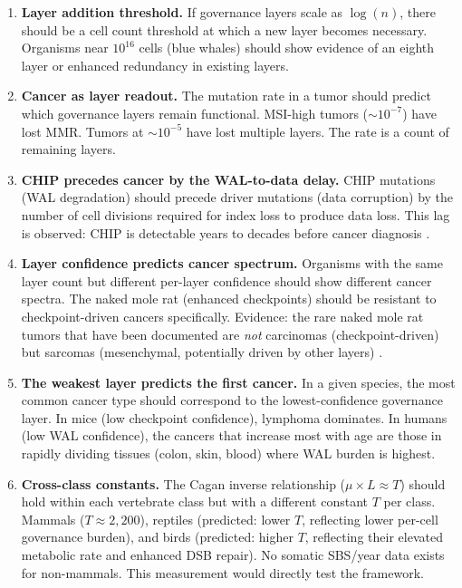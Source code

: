 \documentclass[11pt]{article}
\theoremstyle{definition}
\begin{document}
\begin{enumerate}
\item \textbf{Layer addition threshold.} If governance layers scale as
   $\log(n)$, there should be a cell count threshold at which a new
   layer becomes necessary. Organisms near $10^{16}$ cells (blue whales)
   should show evidence of an eighth layer or enhanced redundancy in
   existing layers.

\item \textbf{Cancer as layer readout.} The mutation rate in a tumor
   should predict which governance layers remain functional. MSI-high
   tumors ($\sim 10^{-7}$) have lost MMR. Tumors at $\sim 10^{-5}$
   have lost multiple layers. The rate is a count of remaining layers.

\item \textbf{CHIP precedes cancer by the WAL-to-data delay.} CHIP
   mutations (WAL degradation) should precede driver mutations (data
   corruption) by the number of cell divisions required for index
   loss to produce data loss. This lag is observed: CHIP is detectable
   years to decades before cancer diagnosis \cite{Jaiswal2014}.

\item \textbf{Layer confidence predicts cancer spectrum.} Organisms
   with the same layer count but different per-layer confidence should
   show different cancer spectra. The naked mole rat (enhanced
   checkpoints) should be resistant to checkpoint-driven cancers
   specifically. Evidence: the rare naked mole rat tumors that have
   been documented are \emph{not} carcinomas (checkpoint-driven) but
   sarcomas (mesenchymal, potentially driven by other layers)
   \cite{Delaney2016}.

\item \textbf{The weakest layer predicts the first cancer.} In a
   given species, the most common cancer type should correspond to
   the lowest-confidence governance layer. In mice (low checkpoint
   confidence), lymphoma dominates. In humans (low WAL confidence),
   the cancers that increase most with age are those in rapidly
   dividing tissues (colon, skin, blood) where WAL burden is highest.

\item \textbf{Cross-class constants.} The Cagan inverse relationship
   ($\mu \times L \approx T$) should hold within each vertebrate
   class but with a different constant $T$ per class. Mammals
   ($T \approx 2{,}200$), reptiles (predicted: lower $T$, reflecting
   lower per-cell governance burden), and birds (predicted: higher $T$,
   reflecting their elevated metabolic rate and enhanced DSB repair).
   No somatic SBS/year data exists for non-mammals. This measurement
   would directly test the framework.


\end{enumerate}
\end{document}
